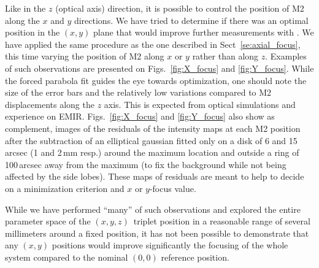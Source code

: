 Like in the $z$ (optical axis) direction, it is possible to control the position
of M2 along the $x$ and $y$ directions. We have tried to determine if there was
an optimal position in the $(x,y)$ plane that would improve further measurements
with \nika. We have applied the same procedure as the one described in
Sect~\ref{se:axial_focus}, this time varying the position of M2 along $x$ or $y$
rather than along $z$. Examples of such observations are presented on
Figs.~\ref{fig:X_focus} and \ref{fig:Y_focus}. While the forced parabola fit
guides the eye towards optimization, one should note the size of the error bars
and the relatively low variations compared to M2 displacements along the $z$
axis. This is expected from optical simulations and experience on
EMIR. Figs.~\ref{fig:X_focus} and \ref{fig:Y_focus} also show as complement,
images of the residuals of the intensity maps at each M2 position after the
subtraction of an elliptical gaussian fitted only on a disk of 6 and 15\,arcsec
(1 and 2\,mm resp.) around the maximum location and outside a ring of 100\,arcsec
away from the maximum (to fix the background while not being affected by the
side lobes). These maps of residuals are meant to help to decide on a minimization
criterion and $x$ or $y$-focus value.

While we have performed ``many'' of such observations and explored the entire
parameter space of the $(x,y,z)$~triplet position in a reasonable range of
several millimeters around a fixed position, it has not been possible to
demonstrate that any $(x,y)$ positions would improve significantly the
focusing of the whole system compared to the nominal $(0,0)$ reference
position.  


